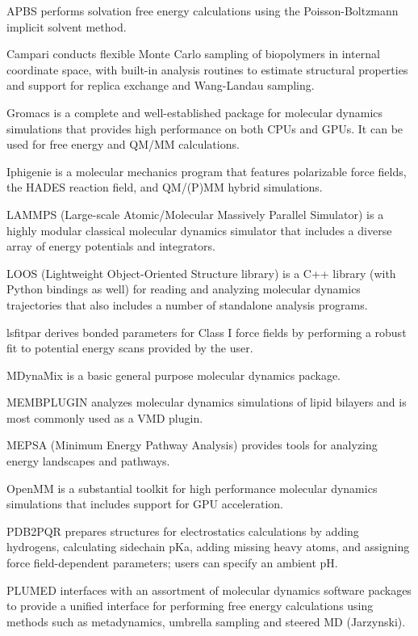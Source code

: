 APBS \cite{Baker_2001} performs solvation free energy calculations using the Poisson-Boltzmann implicit solvent method.

Campari \cite{Vitalis_2009} conducts flexible Monte Carlo sampling of biopolymers in internal coordinate space, with built-in analysis routines to estimate structural properties and support for replica exchange and Wang-Landau sampling.

Gromacs \cite{Pronk_2013} is a complete and well-established package for molecular dynamics simulations that provides high performance on both CPUs and GPUs.  It can be used for free energy and QM/MM calculations.

Iphigenie \cite{Lorenzen_2012} is a molecular mechanics program that features polarizable force fields, the HADES reaction field, and QM/(P)MM hybrid simulations.

LAMMPS  (Large-scale Atomic/Molecular Massively Parallel Simulator) \cite{Plimpton_1995} is a highly modular classical molecular dynamics simulator that includes a diverse array of energy potentials and integrators.

LOOS (Lightweight Object-Oriented Structure library) \cite{Romo_2014} is a C++ library (with Python bindings as well) for reading and analyzing molecular dynamics trajectories that also includes a number of standalone analysis programs.

lsfitpar \cite{Vanommeslaeghe_2015} derives bonded parameters for Class I force fields by performing a robust fit to potential energy scans provided by the user.

MDynaMix \cite{Lyubartsev_2000} is a basic general purpose molecular dynamics package.

MEMBPLUGIN \cite{Guixa-Gonzalez_2014} analyzes molecular dynamics simulations of lipid bilayers and is most commonly used as a VMD plugin.

MEPSA (Minimum Energy Pathway Analysis) \cite{Marcos_Alcalde_2015} provides tools for analyzing energy landscapes and pathways.

OpenMM  \cite{Eastman_2013} is a substantial toolkit for high performance molecular dynamics simulations that includes support for GPU acceleration.

PDB2PQR \cite{Dolinsky_2007} prepares structures for electrostatics calculations by adding hydrogens, calculating sidechain pKa, adding missing heavy atoms, and assigning force field-dependent parameters; users can specify an ambient pH.

PLUMED \cite{Tribello_2014} interfaces with an assortment of molecular dynamics software packages to provide a unified interface for performing free energy calculations using methods such as metadynamics, umbrella sampling and steered MD (Jarzynski).

